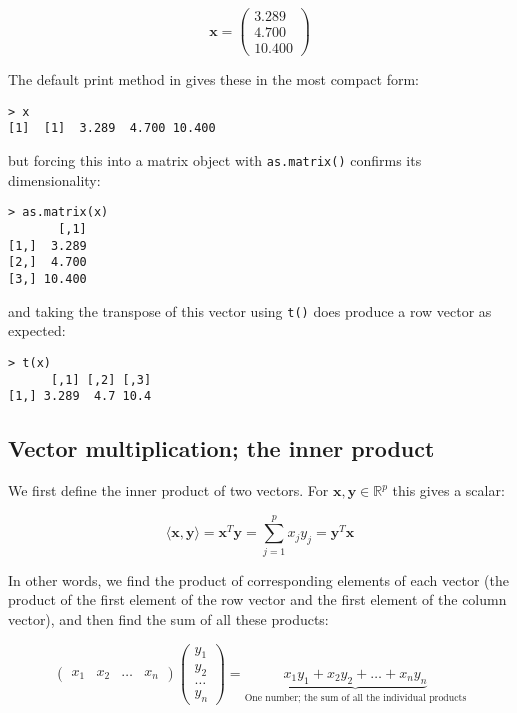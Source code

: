 \begin{displaymath}
\boldsymbol{x} = \left( \begin{array}{r} 3.289 \\  4.700 \\ 10.400 \end{array} \right)
\end{displaymath}

The default print method in \R gives these in the most compact form:
\singlespacing
\begin{verbatim}
> x 
[1]  [1]  3.289  4.700 10.400
\end{verbatim}
\onehalfspacing
but forcing this into a matrix object with \verb+as.matrix()+ confirms its dimensionality:
\singlespacing
\begin{verbatim}
> as.matrix(x)
       [,1]
[1,]  3.289
[2,]  4.700
[3,] 10.400
\end{verbatim}
\onehalfspacing
and taking the transpose of this vector using \verb+t()+ does produce a row vector as expected:
\singlespacing
\begin{verbatim}
> t(x)
      [,1] [,2] [,3]
[1,] 3.289  4.7 10.4
\end{verbatim}
\onehalfspacing


\subsection{Vector multiplication; the inner product}
\label{vectormult}

We first define the inner product of two vectors.   For $\boldsymbol{x}, \boldsymbol{y} \in  \mathbb{R}^{p}$ this gives a scalar:

\begin{displaymath}
\langle \boldsymbol{x}, \boldsymbol{y} \rangle = \boldsymbol{x}^{T}\boldsymbol{y} = \sum_{j=1}^{p}x_{j}y_{j} = \boldsymbol{y}^{T}\boldsymbol{x}
\end{displaymath}

In other words, we find the product of corresponding elements of each vector (the product of the first element of the row vector and the first element of the column vector), and then find the sum of all these products:   

\begin{displaymath}
\left(
\begin{array}{rrrr}
x_{1} & x_{2} & \ldots & x_{n}
\end{array}
\right)
\left(
\begin{array}{r}
y_{1}\\
y_{2}\\
\ldots\\
y_{n}
\end{array}
\right)
=
\underbrace{x_{1}y_{1} + x_{2}y_{2} + \ldots + x_{n}y_{n}}_{\mbox{One number; the sum of all the individual products}}
\end{displaymath}


